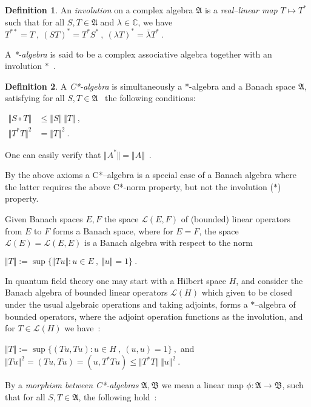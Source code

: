 \documentclass[12pt]{article}
\theoremstyle{plain}
\theoremstyle{definition}
\newtheorem{definition}{Definition}[section]
\numberwithin{equation}{section}
\newcommand{\bC}{\mathbb{C}}
\newcommand{\lra}{{\longrightarrow}}
\begin{document}
\begin{definition}
An \emph{involution} on a complex algebra $\mathfrak A$ is a \emph{real--linear map} $T \mapsto T^*$ 
such that for all $S, T \in \mathfrak A$ and $\lambda \in \bC$, we have $ T^{**} = T~,~ (ST)^* = T^* S^*~,~ (\lambda T)^* = \bar{\lambda} T^*~. $ 
\end{definition}

A \emph{*-algebra} is said to be a complex associative algebra together with an involution $*$~.

\begin{definition}
A \emph{C*-algebra} is simultaneously a *-algebra and a Banach space $\mathfrak A$, 
satisfying for all $S, T \in \mathfrak A$~ the following conditions:


$ \begin{aligned} \Vert S \circ T \Vert &\leq \Vert S \Vert ~ \Vert T \Vert~, \\ \Vert T^* T \Vert^2 & = \Vert T\Vert^2 ~. \end{aligned}$

\end{definition}

 One can easily verify that $\Vert A^* \Vert = \Vert A \Vert$~. 



 By the above axioms a C*--algebra is a special case of a Banach algebra where the latter requires the above C*-norm property, but not the involution ($*$) property. 

 Given Banach spaces $E, F$ the space $\mathcal L(E, F)$ of (bounded) linear operators from $E$ to $F$ forms a Banach space, where for $E=F$, the space $\mathcal L(E) = \mathcal L(E, E)$ is a Banach algebra with respect to the norm 

$\Vert T \Vert := \sup\{ \Vert Tu \Vert : u \in E~,~ \Vert u \Vert= 1 \}~. $

 
 In quantum field theory one may start with a Hilbert space $H$, and consider the Banach 
algebra of bounded linear operators $\mathcal L(H)$ which given to be closed under the usual 
algebraic operations and taking adjoints, forms a $*$--algebra of bounded operators, where the 
adjoint operation functions as the involution, and for $T \in \mathcal L(H)$ we have~: 


$ \Vert T \Vert := \sup\{ ( Tu , Tu): u \in H~,~ (u,u) = 1 \}~,$ and $ \Vert Tu \Vert^2 = (Tu, 
Tu) = (u, T^*Tu) \leq \Vert T^* T \Vert~ \Vert u \Vert^2~.$


 By a \emph{morphism between C*-algebras} $\mathfrak A,\mathfrak B$ we mean a linear map $\phi : 
\mathfrak A \lra \mathfrak B$, such that for all $S, T \in \mathfrak A$, the following hold~: 
\end{document}
